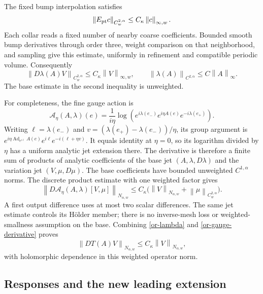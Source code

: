 \documentclass[11pt]{article}
\theoremstyle{remark}
\newcommand{\norm}[1]{\left\|#1\right\|}
\begin{document}
The fixed bump interpolation satisfies
\begin{equation}\label{or-point-weighted}
 \norm{E_{\rm pt}c}_{C^{2,\alpha}_w}
          \le C_\kappa\norm{c}_{\infty,w}.
\end{equation}
Each collar reads a fixed number of nearby coarse coefficients.
Bounded smooth bump derivatives through order three, weight
comparison on that neighborhood, and sampling give this estimate,
uniformly in refinement and compatible periodic volume.
Consequently
\begin{equation}\label{or-lambda}
 \norm{D\lambda(A)V}_{C^{2,\alpha}_w}
       \le C_\kappa\norm{V}_{\infty,w},\qquad
 \norm{\lambda(A)}_{C^{2,\alpha}}
       \le C\norm{A}_\infty.
\end{equation}
The base estimate in the second inequality is unweighted.

For completeness, the fine gauge action is
\[
 \mathscr A_\eta(A,\lambda)(e)=\frac1{i\eta}\log
 (e^{i\lambda(e_-)}e^{i\eta A(e)}e^{-i\lambda(e_+)}).
\]
Writing $\ell=\lambda(e_-)$ and
$v=(\lambda(e_+)-\lambda(e_-))/\eta$, its group argument is
$e^{i\eta\operatorname{Ad}_{e^{i\ell}}A(e)}
e^{i\ell}e^{-i(\ell+\eta v)}$.
It equals identity at $\eta=0$, so its logarithm divided by
$\eta$ has a uniform analytic jet extension there.
The derivative is therefore a finite sum of products of analytic
coefficients of the base jet $(A,\lambda,D\lambda)$ and the
variation jet $(V,\mu,D\mu)$. The base coefficients have bounded
unweighted $C^{1,\alpha}$ norms. The discrete product estimate
with one weighted factor gives
\begin{equation}\label{or-gauge-derivative}
 \norm{D\mathscr A_\eta(A,\lambda)[V,\mu]}_{N_{\alpha,w}}
 \le C_\kappa\bigl(\norm{V}_{N_{\alpha,w}}
                         +\norm{\mu}_{C^{2,\alpha}_w}\bigr).
\end{equation}
A first output difference uses at most two scalar differences.
The same jet estimate controls its H\"older member; there is no
inverse-mesh loss or weighted-smallness assumption on the base.
Combining \eqref{or-lambda} and \eqref{or-gauge-derivative} proves
\begin{equation}\label{or-DT}
 \norm{DT(A)V}_{N_{\alpha,w}}
                  \le C_\kappa\norm{V}_{N_{\alpha,w}},
\end{equation}
with holomorphic dependence in this weighted operator norm.

\subsection{Responses and the new leading extension}
\end{document}
